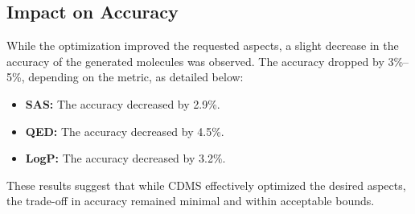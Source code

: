 \documentclass[10pt]{article} %
\begin{document}
\subsection{Impact on Accuracy}
While the optimization improved the requested aspects, a slight decrease in the accuracy of the generated molecules was observed. The accuracy dropped by 3\%--5\%, depending on the metric, as detailed below:
\begin{itemize}
    \item \textbf{SAS:} The accuracy decreased by 2.9\%.
    \item \textbf{QED:} The accuracy decreased by 4.5\%.
    \item \textbf{LogP:} The accuracy decreased by 3.2\%.
\end{itemize}

These results suggest that while CDMS effectively optimized the desired aspects, the trade-off in accuracy remained minimal and within acceptable bounds.
\end{document}
